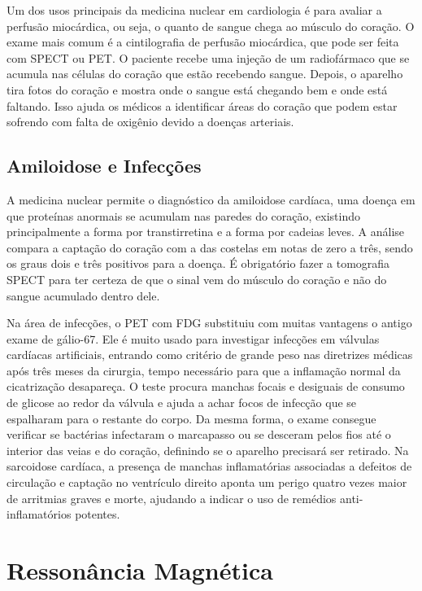 \documentclass[a4paper,12pt,oneside,openright]{abntex2}
\begin{document}
Um dos usos principais da medicina nuclear em cardiologia é para avaliar a perfusão miocárdica, ou seja, o quanto de sangue chega ao músculo do coração. O exame mais comum é a cintilografia de perfusão miocárdica, que pode ser feita com SPECT ou PET. O paciente recebe uma injeção de um radiofármaco que se acumula nas células do coração que estão recebendo sangue. Depois, o aparelho tira fotos do coração e mostra onde o sangue está chegando bem e onde está faltando. Isso ajuda os médicos a identificar áreas do coração que podem estar sofrendo com falta de oxigênio devido a doenças arteriais.

\section{Amiloidose e Infecções}

A medicina nuclear permite o diagnóstico da amiloidose cardíaca, uma doença em que proteínas anormais se acumulam nas paredes do coração, existindo principalmente a forma por transtirretina e a forma por cadeias leves. A análise compara a captação do coração com a das costelas em notas de zero a três, sendo os graus dois e três positivos para a doença. É obrigatório fazer a tomografia SPECT para ter certeza de que o sinal vem do músculo do coração e não do sangue acumulado dentro dele.

Na área de infecções, o PET com FDG substituiu com muitas vantagens o antigo exame de gálio-67. Ele é muito usado para investigar infecções em válvulas cardíacas artificiais, entrando como critério de grande peso nas diretrizes médicas após três meses da cirurgia, tempo necessário para que a inflamação normal da cicatrização desapareça. O teste procura manchas focais e desiguais de consumo de glicose ao redor da válvula e ajuda a achar focos de infecção que se espalharam para o restante do corpo. Da mesma forma, o exame consegue verificar se bactérias infectaram o marcapasso ou se desceram pelos fios até o interior das veias e do coração, definindo se o aparelho precisará ser retirado. Na sarcoidose cardíaca, a presença de manchas inflamatórias associadas a defeitos de circulação e captação no ventrículo direito aponta um perigo quatro vezes maior de arritmias graves e morte, ajudando a indicar o uso de remédios anti-inflamatórios potentes.

\chapter{Ressonância Magnética}
\end{document}
